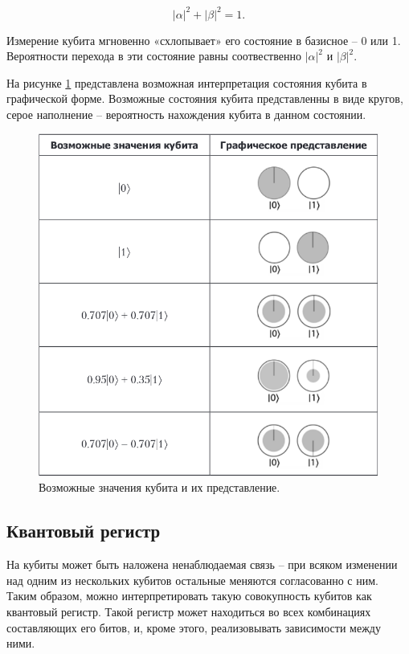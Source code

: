\begin{equation}
\label{for:ver}
|\alpha|^2 + |\beta|^2 = 1. 
\end{equation} 

Измерение кубита мгновенно «схлопывает»  его состояние в базисное – 0 или 1. Вероятности перехода в эти состояние равны соотвественно $|\alpha|^2$ и $|\beta|^2$. 

На рисунке \ref{img:qbits_table} представлена возможная интерпретация состояния кубита в графической форме. Возможные состояния кубита представленны в виде кругов, серое наполнение -- вероятность нахождения кубита в данном состоянии.

\begin{figure}[H]
	\begin{center}
		\includegraphics[scale=0.45]{img/qbits.png}
	\end{center}
	\captionsetup{justification=centering}
	\caption{Возможные значения кубита и их представление.}
	\label{img:qbits_table}
\end{figure}

\subsection{Квантовый регистр}

На кубиты может быть наложена ненаблюдаемая связь -- при всяком изменении над одним из нескольких кубитов остальные меняются согласованно с ним. Таким образом, можно интерпретировать такую совокупность кубитов как квантовый регистр. Такой регистр может находиться во всех комбинациях составляющих его битов, и, кроме этого, реализовывать зависимости между ними.

